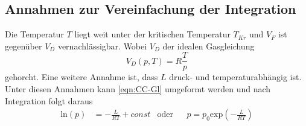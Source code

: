 
\subsection{Annahmen zur Vereinfachung der Integration} %
\label{sub:Vereinfachung}
Die Temperatur $T$ liegt weit unter der kritischen Temperatur $T_{Kr}$ und $V_F$ ist gegenüber $V_D$ vernachlässigbar.
Wobei $V_D$ der idealen Gasgleichung
\begin{equation*}
    V_D(p,T) = R\frac{T}{p}
\end{equation*}
gehorcht.
Eine weitere Annahme ist, dass $L$ druck- und temperaturabhängig ist. 
Unter diesen Annahmen kann \autoref{eqn:CC-Gl} umgeformt werden und nach Integration folgt daraus
\begin{align}
    \text{ln}(p) &= -\frac{L}{RT}+const &\text{oder} && p=p_0 \text{exp}(-\frac{L}{RT})
    \label{eqn:CC-Gl_2}
\end{align}
 